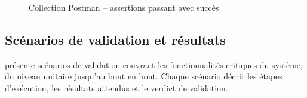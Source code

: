 \begin{figure}[H]
    \caption{Collection Postman --  assertions passant avec succès}
    \label{fig:postman}
\end{figure}

\subsection{Scénarios de validation et résultats}
\label{ch5:scenarios}

 présente  scénarios de validation couvrant les fonctionnalités critiques du système, du niveau unitaire jusqu'au bout en bout. Chaque scénario décrit les étapes d'exécution, les résultats attendus et le verdict de validation.

